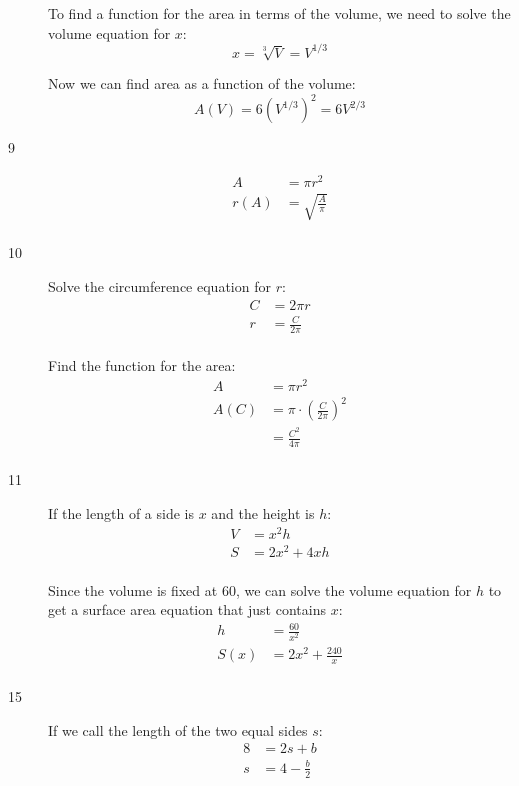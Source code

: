 \documentclass{exam}
\begin{document}
\begin{description}
      To find a function for the area in terms of the volume, we need to solve the volume equation for $x$: 
      \[
        x = \sqrt[3]{V} = V^{1/3}
      \]
      
      Now we can find area as a function of the volume:
      \[
        A(V) = 6(V^{1/3})^2 = 6 V^{2/3}
      \]

    \item[9]
      \begin{align*}
        A    &= \pi r^2 \\
        r(A) &= \sqrt{\frac{A}{\pi}} \\
      \end{align*}

    \item[10]
      Solve the circumference equation for $r$:
      \begin{align*}
        C &= 2 \pi r \\
        r &= \frac{C}{2 \pi} \\
      \end{align*}

      Find the function for the area:
      \begin{align*}
        A    &= \pi r^2 \\
        A(C) &= \pi \cdot \left( \frac{C}{2 \pi} \right)^2 \\
             &= \frac{C^2}{4 \pi} \\
      \end{align*}

    \item[11]
      If the length of a side is $x$ and the height is $h$:
      \begin{align*}
        V &= x^2h \\
        S &= 2x^2 + 4xh \\
      \end{align*}

      Since the volume is fixed at 60, we can solve the volume equation for $h$ to get a surface area equation that just
      contains $x$:
      \begin{align*}
        h    &= \frac{60}{x^2} \\
        S(x) &= 2x^2 + \frac{240}{x} \\
      \end{align*}

    \item[15]
      If we call the length of the two equal sides $s$:
      \begin{align*}
        8 &= 2s + b \\
        s &= 4 - \frac{b}{2} \\
      \end{align*}


\end{description}
\end{document}
